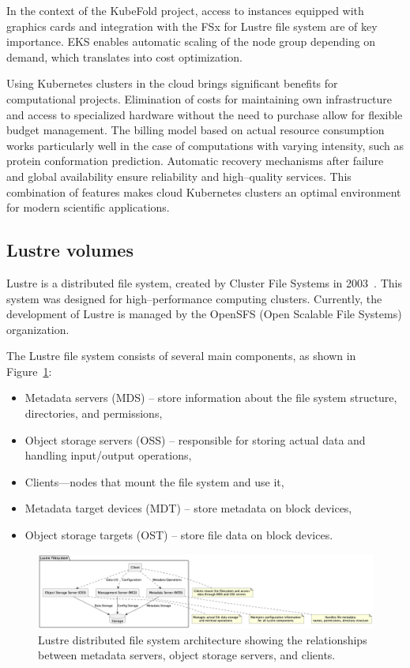 In the context of the KubeFold project, access to instances equipped with graphics cards and integration with the FSx for Lustre file system are of key importance.
EKS enables automatic scaling of the node group depending on demand, which translates into cost optimization.

Using Kubernetes clusters in the cloud brings significant benefits for computational projects.
Elimination of costs for maintaining own infrastructure and access to specialized hardware without the need to purchase allow for flexible budget management.
The billing model based on actual resource consumption works particularly well in the case of computations with varying intensity, such as protein conformation prediction.
Automatic recovery mechanisms after failure and global availability ensure reliability and high--quality services.
This combination of features makes cloud Kubernetes clusters an optimal environment for modern scientific applications.

\subsection{Lustre volumes}\label{subsec:lustre-volumes}

Lustre is a distributed file system, created by Cluster File Systems in 2003~\cite{lustre_fs}.
This system was designed for high--performance computing clusters.
Currently, the development of Lustre is managed by the OpenSFS (Open Scalable File Systems) organization.

The Lustre file system consists of several main components, as shown in Figure~\ref{fig:lustre-arch}:
\begin{itemize}
    \item Metadata servers (MDS) -- store information about the file system structure, directories, and permissions,
    \item Object storage servers (OSS) -- responsible for storing actual data and handling input/output operations,
    \item Clients—nodes that mount the file system and use it,
    \item Metadata target devices (MDT) -- store metadata on block devices,
    \item Object storage targets (OST) -- store file data on block devices.
\end{itemize}

\begin{figure}[htbp]
    \centering
    \includegraphics[width=\textwidth]{images/lustre}
    \caption{Lustre distributed file system architecture showing the relationships between metadata servers, object storage servers, and clients.}
    \label{fig:lustre-arch}
\end{figure}

